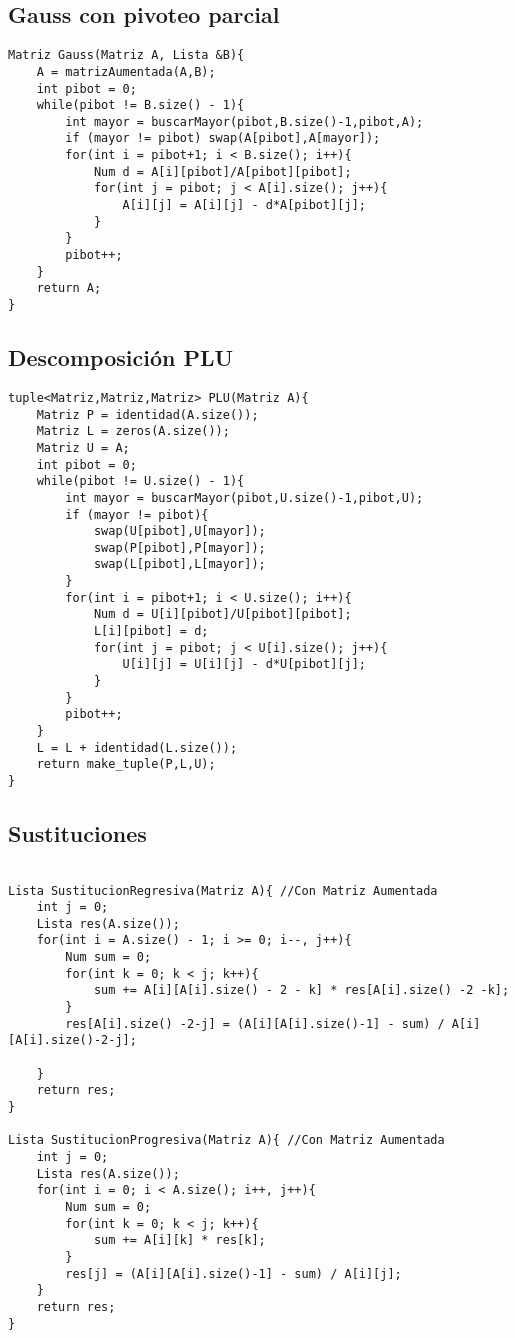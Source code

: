 \documentclass[a4paper,12pt]{article}
\begin{document}
  \subsection{Gauss con pivoteo parcial}
  \begin{lstlisting}
Matriz Gauss(Matriz A, Lista &B){
	A = matrizAumentada(A,B);
	int pibot = 0;
	while(pibot != B.size() - 1){
		int mayor = buscarMayor(pibot,B.size()-1,pibot,A);
		if (mayor != pibot) swap(A[pibot],A[mayor]);
		for(int i = pibot+1; i < B.size(); i++){
			Num d = A[i][pibot]/A[pibot][pibot];
			for(int j = pibot; j < A[i].size(); j++){
				A[i][j] = A[i][j] - d*A[pibot][j];
			}
		}
		pibot++;
	}
	return A;
}
  \end{lstlisting}
  \subsection{Descomposición PLU}
  \begin{lstlisting}
tuple<Matriz,Matriz,Matriz> PLU(Matriz A){
	Matriz P = identidad(A.size());
	Matriz L = zeros(A.size());
	Matriz U = A;
	int pibot = 0;
	while(pibot != U.size() - 1){
		int mayor = buscarMayor(pibot,U.size()-1,pibot,U);
		if (mayor != pibot){
			swap(U[pibot],U[mayor]);		
			swap(P[pibot],P[mayor]);
			swap(L[pibot],L[mayor]);
		} 
		for(int i = pibot+1; i < U.size(); i++){
			Num d = U[i][pibot]/U[pibot][pibot];
			L[i][pibot] = d;
			for(int j = pibot; j < U[i].size(); j++){
				U[i][j] = U[i][j] - d*U[pibot][j];
			}
		}
		pibot++;
	}
	L = L + identidad(L.size());
	return make_tuple(P,L,U);
}
  \end{lstlisting}
   \subsection{Sustituciones}
   \begin{lstlisting}
   
Lista SustitucionRegresiva(Matriz A){ //Con Matriz Aumentada
	int j = 0;
	Lista res(A.size());
	for(int i = A.size() - 1; i >= 0; i--, j++){
		Num sum = 0;
		for(int k = 0; k < j; k++){
			sum += A[i][A[i].size() - 2 - k] * res[A[i].size() -2 -k];
		}
		res[A[i].size() -2-j] = (A[i][A[i].size()-1] - sum) / A[i][A[i].size()-2-j];

	}
	return res;
}

Lista SustitucionProgresiva(Matriz A){ //Con Matriz Aumentada
	int j = 0;
	Lista res(A.size());
	for(int i = 0; i < A.size(); i++, j++){
		Num sum = 0;
		for(int k = 0; k < j; k++){
			sum += A[i][k] * res[k];
		}
		res[j] = (A[i][A[i].size()-1] - sum) / A[i][j];
	}
	return res;
}
   \end{lstlisting}
\end{document}
